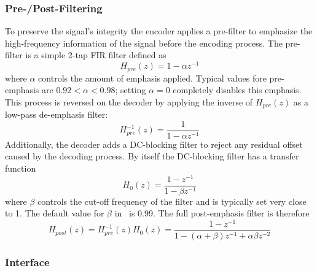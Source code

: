 \subsubsection{Pre-/Post-Filtering}
\label{module:audio:cvsd:filtering}
To preserve the signal's integrity the encoder applies a pre-filter
to emphasize the high-frequency information of the signal before the
encoding process.
The pre-filter is a simple 2-tap FIR filter defined as
%
\begin{equation}
    H_{pre}(z) = 1 - \alpha z^{-1}
\end{equation}
%
where $\alpha$ controls the amount of emphasis applied.
Typical values fore pre-emphasis are $0.92 < \alpha < 0.98$;
setting $\alpha=0$ completely disables this emphasis.
%
This process is reversed on the decoder by applying the inverse of
$H_{pre}(z)$ as a low-pass de-emphasis filter:
%
\begin{equation}
    H_{pre}^{-1}(z) = 
        \frac{ 1 }{ 1 - \alpha z^{-1} }
\end{equation}
%
Additionally, the decoder adds a DC-blocking filter to reject any
residual offset caused by the decoding process.
By itself the DC-blocking filter has a transfer function
%
\begin{equation}
    H_{0}(z) = 
        \frac{ 1 - z^{-1} }{ 1 - \beta z^{-1} }
\end{equation}
%
where $\beta$ controls the cut-off frequency of the filter and is
typically set very close to 1.
The default value for $\beta$ in \liquid\ is 0.99.
The full post-emphasis filter is therefore
%
\begin{equation}
    H_{post}(z) = 
    H_{pre}^{-1}(z) H_0(z) =
        \frac{
            1 - z^{-1}
        }{
            1 - (\alpha + \beta) z^{-1} + \alpha\beta z^{-2}
        }
\end{equation}
%

\subsubsection{Interface}
\label{module:audio:cvsd:interface}


